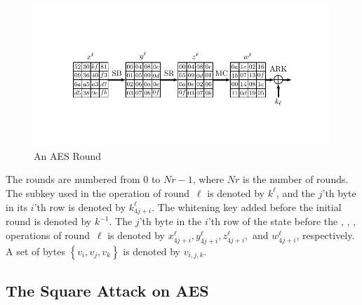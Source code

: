 \begin{figure}
\vspace*{-1.1cm}
\begin{center}
\includegraphics[trim = 10em 8em 10em 4em]{fig/AES-round.pdf}    
\end{center}
\caption{An AES Round}\label{fig:AESRound}
\end{figure}

The rounds are numbered from $0$ to $Nr-1$, where $Nr$ is the number of rounds. The subkey used in the \ak operation of round~$\ell$ is denoted by $k^{\ell}$, and the $j$'th byte in its $i$'th row is denoted by $k^{\ell}_{4j+i}$. The whitening key added before the initial round is denoted by $k^{-1}$. The $j$'th byte in the $i$'th row of the state before the \subB, \sr, \mc, \ak operations of round~$\ell$ is denoted by $x^\ell_{4j+i}, y^\ell_{4j+i}, z^\ell_{4j+i},$ and $w^\ell_{4j+i}$, respectively.  A set of bytes $\left\{v_i, v_j, v_k\right\}$ is denoted by $v_{i,j,k}$.

\subsection{The Square Attack on AES}
\label{sec:sub:Square}

